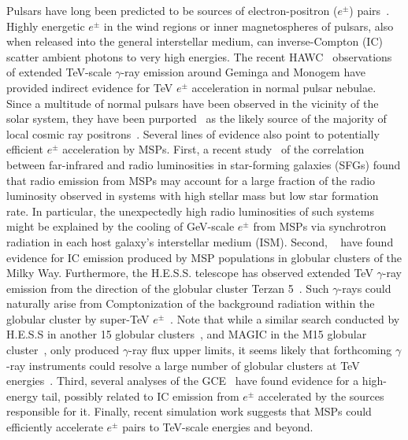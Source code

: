 \documentclass[doublespace,nopageskip]{VTthesis} %
\begin{document}
Pulsars have long been predicted to be sources of electron-positron ($e^{\pm}$) pairs~\citep{Erber:1966,Sturrock:1970,Sturrock:1971, Aharonian:1995, Atoyan:1995}. Highly energetic $e^{\pm}$ in the wind regions or inner magnetospheres of pulsars, 
also when released into the general interstellar medium,
can inverse-Compton (IC) scatter ambient photons to very high energies. 
The recent HAWC~\citep{Abeysekara:2017old} observations of extended TeV-scale $\gamma$-ray emission around Geminga and Monogem have provided indirect evidence for TeV $e^{\pm}$ acceleration in normal pulsar nebulae.  Since a multitude of normal pulsars have been observed in the vicinity of the solar system, they have been purported~\citep{Hooper:2008kg, Delahaye:2010,Abeysekara:2017old,Hooper:2017gtd, Profumo:2018fmz, DiMauro:2019yvh, Johannesson:2019jlk} as the likely source of the majority of local cosmic ray positrons~\citep{Aguilar:2013qda}.    
Several lines of evidence also point to potentially efficient $e^{\pm}$ acceleration by MSPs. First, a recent study~\citep{Sudoh:2020hyu} of the correlation between far-infrared and radio luminosities in star-forming galaxies (SFGs) found that radio emission from MSPs may account for a large fraction of the radio luminosity observed in systems with high stellar mass but low star formation rate. 
%
In particular, the unexpectedly high radio luminosities of such
systems
might be explained by the cooling of GeV-scale $e^{\pm}$ from MSPs via synchrotron radiation in each host galaxy's interstellar medium (ISM). Second, ~\citet{Song:2021zrs} have found evidence for IC emission produced by MSP populations in globular clusters of the Milky Way. Furthermore, the H.E.S.S. telescope has observed extended TeV $\gamma$-ray emission from the direction of the globular cluster Terzan 5~\citep{Abramowski:2013md}. Such $\gamma$-rays could naturally arise from Comptonization of the background radiation within the globular cluster by super-TeV $e^{\pm}$~\citep{Bednarek:2016gpp}. 
%
Note that while a similar search conducted by H.E.S.S in another 15 globular clusters~\citep{Abramowski:2013md}, and MAGIC in the M15 globular cluster~\citep{Acciari:2019ysf}, only produced $\gamma$-ray flux upper limits, it seems likely that forthcoming $\gamma$-ray instruments could resolve a large number of globular clusters at TeV energies~\citep{Ndiyavala:2017hoh,Ndiyavala-Davids:2020wjc}. 
Third, several analyses of the GCE~\citep[e.g.,][]{Horiuchi:2016zwu,Linden:2016rcf,DiMauro:2021raz} have found evidence for a high-energy tail, possibly related to IC emission from $e^\pm$ accelerated by the sources responsible for it. 
%
Finally, recent simulation work \citep{Guepin:2019fjb} suggests that MSPs could efficiently accelerate $e^{\pm}$ pairs to TeV-scale energies and beyond. 
\end{document}
